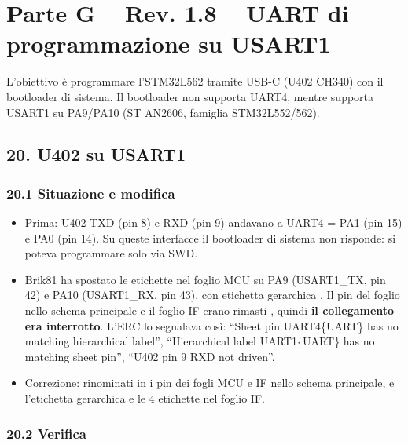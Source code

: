 \clearpage
\section[Parte G – Rev. 1.8 – UART di programmazione su USART1]{Parte G – Rev. 1.8 – UART di programmazione su USART1}

L'obiettivo è programmare l'STM32L562 tramite USB-C (U402 CH340) con il bootloader di sistema. Il bootloader non supporta UART4, mentre supporta USART1 su PA9/\allowbreak{}PA10 (ST AN2606, famiglia STM32L552/\allowbreak{}562).

\subsection[20. U402 su USART1]{20. U402 su USART1 }

\subsubsection[20.1 Situazione e modifica]{20.1 Situazione e modifica}

\begin{itemize}
\item Prima: U402 TXD (pin 8) e RXD (pin 9) andavano a UART4 = PA1 (pin 15) e PA0 (pin 14). Su queste interfacce il bootloader di sistema non risponde: si poteva programmare solo via SWD.
\item Brik81 ha spostato le etichette nel foglio MCU su PA9 (USART1\_\allowbreak{}TX, pin 42) e PA10 (USART1\_\allowbreak{}RX, pin 43), con etichetta gerarchica . Il pin del foglio nello schema principale e il foglio IF erano rimasti , quindi \textbf{il collegamento era interrotto}. L'ERC lo segnalava così: \textquotedblleft{}Sheet pin UART4\{UART\} has no matching hierarchical label\textquotedblright{}, \textquotedblleft{}Hierarchical label UART1\{UART\} has no matching sheet pin\textquotedblright{}, \textquotedblleft{}U402 pin 9 RXD not driven\textquotedblright{}.
\item Correzione: rinominati in  i pin dei fogli MCU e IF nello schema principale, e l'etichetta gerarchica e le 4 etichette nel foglio IF.
\end{itemize}

\subsubsection[20.2 Verifica]{20.2 Verifica}

